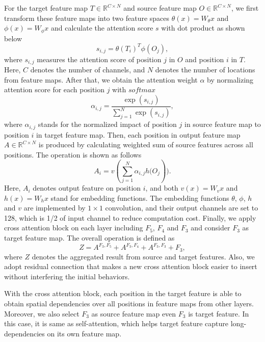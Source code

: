 \documentclass[runningheads]{llncs}
\begin{document}
For the target feature map $T \in \mathbb{R}^{C\times N}$ and source feature map $O \in \mathbb{R}^{C\times N}$, we first transform these feature maps into two feature spaces $\theta(x) =W_\theta x$ and $\phi(x) =W_\phi x$ and calculate the attention score $s$ with dot product as shown below
\begin{equation}
   s_{i,j} = \theta(T_i)^T\phi(O_j),
\end{equation}
where $s_{i,j}$ measures the attention score of position $j$ in $O$ and position $i$ in $T$. Here, $C$ denotes the number of channels, and $N$ denotes the number of locations from feature maps. After that, we obtain the attention weight $\alpha$ by normalizing attention score for each position $j$ with $softmax$
\begin{equation}
    \alpha_{i,j} = \frac{\exp(s_{i,j})}{\sum_{j=1}^N{\exp(s_{i,j})}}, 
\end{equation}
where $\alpha_{i,j}$ stands for the normalized impact of position $j$ in source feature map to position $i$ in target feature map. Then, each position in output feature map $A \in \mathbb{R}^{C\times N}$ is produced by calculating weighted sum of source features across all positions. The operation is shown as follows
\begin{equation}
    A_i =v(\sum_{j=1}^N{\alpha_{i,j}h(O_j})).
\end{equation}
Here, $A_i$ denotes output feature on position $i$, and both $v(x) =W_v x $ and $h(x) =W_h x$ stand for embedding functions. The embedding functions $\theta$, $\phi$, $h$ and $v$ are implemented by $1 \times 1 $ convolution, and their output channels are set to 128, which is 1/2 of input channel to reduce computation cost. Finally, we apply cross attention block on each layer including $F_5$, $F_4$ and $F_3$ and consider $F_3$ as target feature map. The overall operation is defined as
\begin{equation}
    Z = A^{F_3,F_5} + A^{F_3,F_4} + A^{F_3,F_3} + F_3,
\end{equation}
where $Z$ denotes the aggregated result from source and target features. Also, we adopt residual connection that makes a new cross attention block easier to insert without interfering the initial behaviors. 
 
With the cross attention block, each position in the target feature is able to obtain spatial dependencies over all positions in feature maps from other layers. Moreover, we also select $F_3$ as source feature map even $F_3$ is target feature. In this case, it is same as self-attention, which helps target feature capture long-dependencies on its own feature map. 
\end{document}
